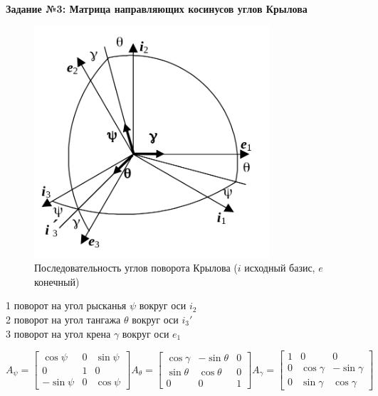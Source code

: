 \documentclass[a4paper, 12pt]{article}%
\begin{document}
	\newpage
	\textbf{Задание №3: Матрица направляющих косинусов углов Крылова}\\
	
	\begin{figure}[H]
		\centering
		\includegraphics[width=0.6\linewidth]{krilov}
		\caption{Последовательность углов поворота Крылова ($i$ исходный базис, $e$ конечный)}
	\end{figure}
	1 поворот на угол рысканья $\psi$ вокруг оси $i_2$\\
	
	2 поворот на угол тангажа $\theta$ вокруг оси $i_3'$\\
	
	3 поворот на угол крена $\gamma$ вокруг оси $e_1$\\
	
	\addvspace{20pt}
	
	$A_\psi=\left[\begin{array}{ccc}\cos \psi & 0 & \sin \psi \\ 0 & 1 & 0 \\ -\sin \psi & 0 & \cos \psi\end{array}\right] A_\theta=\left[\begin{array}{ccc} \cos\gamma & -\sin \theta & 0 \\ \sin \theta & \cos \theta & 0 \\ 0 & 0 & 1\end{array}\right] A_\gamma=\left[\begin{array}{ccc}1 & 0 & 0 \\ 0 & \cos \gamma & -\sin \gamma \\ 0 & \sin \gamma & \cos \gamma\end{array}\right]$ \\
	
	\addvspace{20pt}
\end{document}
